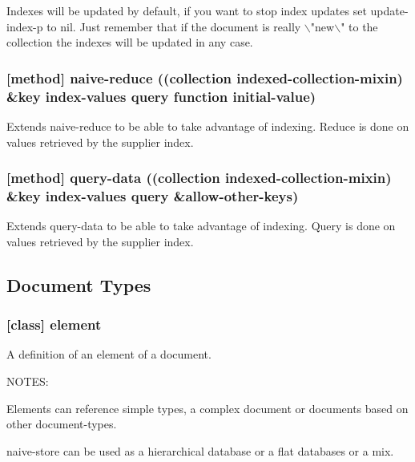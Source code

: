 \documentclass[11pt]{article}
\begin{document}
Indexes will be updated by default, if you want to stop index updates
set update-index-p to nil. Just remember that if the document is
really $\backslash$"new$\backslash$" to the collection the indexes will be updated in any
case.

\subsubsection{[method] naive-reduce ((collection indexed-collection-mixin) \&key index-values query function initial-value)}
\label{sec:org0c0f205}

Extends naive-reduce to be able to take advantage of indexing. Reduce
is done on values retrieved by the supplier index.

\subsubsection{[method] query-data ((collection indexed-collection-mixin) \&key index-values query \&allow-other-keys)}
\label{sec:org766e93b}

Extends query-data to be able to take advantage of indexing. Query is
done on values retrieved by the supplier index.

\subsection{Document Types}
\label{sec:orge51a00c}

\subsubsection{[class] element}
\label{sec:org61c18d9}

A definition of an element of a document.

NOTES:

Elements can reference simple types, a complex document or documents
based on other document-types.

naive-store can be used as a hierarchical database or a flat databases
or a mix.
\end{document}
